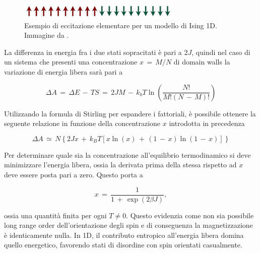 \begin{figure}[H]
    \centering
    \includegraphics[width=0.7\textwidth]{Immagini/dw_Ising1D.png}
    \caption{Esempio di eccitazione elementare per un modello di Ising 1D. Immagine da \cite{galliFSA}.}
    \label{fig: dw_Ising1D}
\end{figure}

La differenza in energia fra i due stati sopracitati è pari a $2 J$, quindi nel caso di un sistema che presenti una concentrazione 
$x\,=\,M/N$ di domain walls la variazione di energia libera sarà pari a 

\begin{equation}
    \Delta A\,=\,\Delta E\,-\,TS\,=\,2JM\,-\,k_bT\ln{\left(\frac{N!}{M!\left(N\,-\,M\right)!}\right)}
    \label{eq: freeE_dw1_Ising1D}
\end{equation}

Utilizzando la formula di Stirling per espandere i fattoriali, è possibile ottenere la seguente relazione in funzione della concentrazione 
$x$ introdotta in precedenza

\begin{equation}
    \Delta A\,\simeq\,N\left\{2Jx\,+\,k_B T \left[x\ln{\left(x\right)}\,+\,\left(1\,-\,x\right)\ln{\left(1\,-\,x\right)}\right]\right\}
    \label{eq: freeE_dw1_Ising1D}
\end{equation}

Per determinare quale sia la concentrazione all'equilibrio termodinamico si deve minimizzare l'energia libera, ossia la derivata prima 
della stessa rispetto ad $x$ deve essere posta pari a zero. Questo porta a 

\begin{equation}
    x\,=\,\frac{1}{1\,+\,\exp{\left(2 \beta J\right)}}, 
    \label{eq: con_dw_Ising1D}
\end{equation}

ossia una quantità finita per ogni $T \neq 0$. Questo evidenzia come non sia possibile long range order dell'orientazione degli spin e 
di conseguenza la magnetizzazione è identicamente nulla. In 1D, il contributo entropico all'energia libera domina quello energetico, 
favorendo stati di disordine con spin orientati casualmente.
